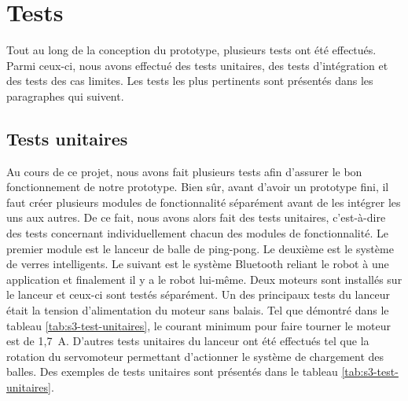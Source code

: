 \section{Tests}

Tout au long de la conception du prototype, plusieurs tests ont été effectués.
Parmi ceux-ci, nous avons effectué des tests unitaires, des tests d'intégration et des tests des cas limites.
Les tests les plus pertinents sont présentés dans les paragraphes qui suivent.

\subsection{Tests unitaires}

Au cours de ce projet, nous avons fait plusieurs tests afin d’assurer le bon fonctionnement de notre prototype.
Bien sûr, avant d’avoir un prototype fini, il faut créer plusieurs modules de fonctionnalité séparément avant de les intégrer les uns aux autres.
De ce fait, nous avons alors fait des tests unitaires, c’est-à-dire des tests concernant individuellement chacun des modules de fonctionnalité.
Le premier module est le lanceur de balle de ping-pong.
Le deuxième est le système de verres intelligents.
Le suivant est le système Bluetooth reliant le robot à une application et finalement il y a le robot lui-même.
Deux moteurs sont installés sur le lanceur et ceux-ci sont testés séparément.
Un des principaux tests du lanceur était la tension d’alimentation du moteur sans balais.
Tel que démontré dans le tableau \ref{tab:s3-test-unitaires}, le courant minimum pour faire tourner le moteur est de 1,7~A.
D'autres tests unitaires du lanceur ont été effectués tel que la rotation du servomoteur permettant d’actionner le système de chargement des balles.
Des exemples de tests unitaires sont présentés dans le tableau \ref{tab:s3-test-unitaires}.

